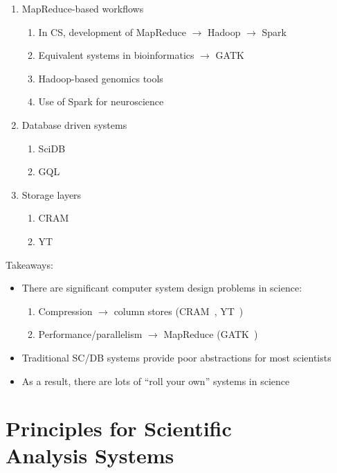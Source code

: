 \documentclass{acm_proc_article-sp}
\begin{document}
\begin{enumerate}
\item MapReduce-based workflows
\begin{enumerate}
\item In CS, development of MapReduce $\rightarrow$ Hadoop $\rightarrow$ Spark
\item Equivalent systems in bioinformatics $\rightarrow$ GATK~\cite{mckenna10}
\item Hadoop-based genomics tools~\cite{schatz09, langmead09}
\item Use of Spark for neuroscience
\end{enumerate}
\item Database driven systems
\begin{enumerate}
\item SciDB~\cite{brown10}
\item GQL~\cite{kozanitis14, bafna13}
\end{enumerate}
\item Storage layers
\begin{enumerate}
\item CRAM~\cite{fritz11}
\item YT~\cite{turk11}
\end{enumerate}
\end{enumerate}

Takeaways:

\begin{itemize}
\item There are significant computer system design problems in science:
\begin{enumerate}
\item Compression $\rightarrow$ column stores (CRAM~\cite{fritz11}, YT~\cite{turk11})
\item Performance/parallelism $\rightarrow$ MapReduce (GATK~\cite{mckenna10})
\end{enumerate}
\item Traditional SC/DB systems provide poor abstractions for most scientists
\item As a result, there are lots of ``roll your own'' systems in science
\end{itemize}

\section{Principles for Scientific \\ Analysis Systems}
\label{sec:principles}
\end{document}
